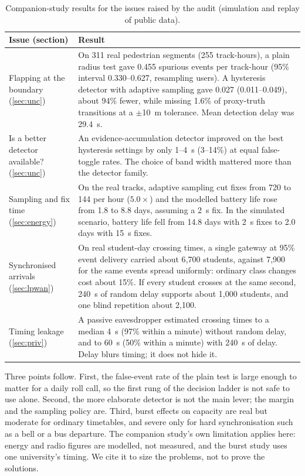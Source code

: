 \documentclass[12pt]{article}
\begin{document}
\begin{table}[tbp]\centering\footnotesize
\caption{Companion-study results for the issues raised by the audit (simulation and replay of public data).}\label{tab:case}
\begin{tabular}{@{}L{3.2cm}L{9.4cm}@{}}\toprule
Issue (section) & Result \\ \midrule
Flapping at the boundary (\ref{sec:unc}) & On 311 real pedestrian segments (255 track-hours), a plain radius test gave 0.455 spurious events per track-hour (95\% interval 0.330--0.627, resampling users). A hysteresis detector with adaptive sampling gave 0.027 (0.011--0.049), about 94\% fewer, while missing 1.6\% of proxy-truth transitions at a $\pm$10~m tolerance. Mean detection delay was 29.4~s. \\
Is a better detector available? (\ref{sec:unc}) & An evidence-accumulation detector improved on the best hysteresis settings by only 1--4~s (3--14\%) at equal false-toggle rates. The choice of band width mattered more than the detector family. \\
Sampling and fix time (\ref{sec:energy}) & On the real tracks, adaptive sampling cut fixes from 720 to 144 per hour ($5.0\times$) and the modelled battery life rose from 1.8 to 8.8 days, assuming a 2~s fix. In the simulated scenario, battery life fell from 14.8 days with 2~s fixes to 2.0 days with 15~s fixes. \\
Synchronised arrivals (\ref{sec:lpwan}) & On real student-day crossing times, a single gateway at 95\% event delivery carried about 6{,}700 students, against 7{,}900 for the same events spread uniformly: ordinary class changes cost about 15\%. If every student crosses at the same second, 240~s of random delay supports about 1{,}000 students, and one blind repetition about 2{,}100. \\
Timing leakage (\ref{sec:priv}) & A passive eavesdropper estimated crossing times to a median 4~s (97\% within a minute) without random delay, and to 60~s (50\% within a minute) with 240~s of delay. Delay blurs timing; it does not hide it. \\ \bottomrule
\end{tabular}
\end{table}

Three points follow. First, the false-event rate of the plain test is large enough to matter for a daily roll call, so the first rung of the decision ladder is not safe to use alone. Second, the more elaborate detector is not the main lever; the margin and the sampling policy are. Third, burst effects on capacity are real but moderate for ordinary timetables, and severe only for hard synchronisation such as a bell or a bus departure. The companion study's own limitation applies here: energy and radio figures are modelled, not measured, and the burst study uses one university's timing. We cite it to size the problems, not to prove the solutions.
\end{document}
